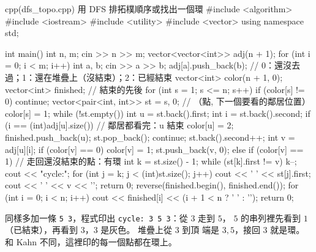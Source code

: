 \begin{example}[label=ex:dfs-topo]{cpp}{(dfs\_topo.cpp) 用 DFS 排拓樸順序或找出一個環}
#include <algorithm>
#include <iostream>
#include <utility>
#include <vector>
using namespace std;

int main() {
    int n, m;
    cin >> n >> m;
    vector<vector<int>> adj(n + 1);
    for (int i = 0; i < m; i++) {
        int a, b;
        cin >> a >> b;
        adj[a].push_back(b);
    }
    // 0：還沒去過；1：還在堆疊上（沒結束）；2：已經結束
    vector<int> color(n + 1, 0);
    vector<int> finished;                       // 結束的先後
    for (int s = 1; s <= n; s++) {
        if (color[s] != 0) {
            continue;
        }
        vector<pair<int, int>> st = {{s, 0}};   // （點, 下一個要看的鄰居位置）
        color[s] = 1;
        while (!st.empty()) {
            int u = st.back().first;
            int i = st.back().second;
            if (i == (int)adj[u].size()) {      // 鄰居都看完：u 結束
                color[u] = 2;
                finished.push_back(u);
                st.pop_back();
                continue;
            }
            st.back().second++;
            int v = adj[u][i];
            if (color[v] == 0) {
                color[v] = 1;
                st.push_back({v, 0});
            } else if (color[v] == 1) {         // 走回還沒結束的點：有環
                int k = st.size() - 1;
                while (st[k].first != v) {
                    k--;
                }
                cout << "cycle:";
                for (int j = k; j < (int)st.size(); j++) {
                    cout << ' ' << st[j].first;
                }
                cout << ' ' << v << '\n';
                return 0;
            }
        }
    }
    reverse(finished.begin(), finished.end());
    for (int i = 0; i < n; i++) {
        cout << finished[i] << (i + 1 < n ? ' ' : '\n');
    }
    return 0;
}
\end{example}


同樣多加一條 \texttt{5 3}，程式印出 \texttt{cycle: 3 5 3}：從 $3$ 走到 $5$，
$5$ 的串列裡先看到 $1$（已結束），再看到 $3$，$3$ 是灰色。 堆疊上從 $3$ 到頂
端是 $3, 5$，接回 $3$ 就是環。 和 Kahn 不同，這裡印的每一個點都在環上。

